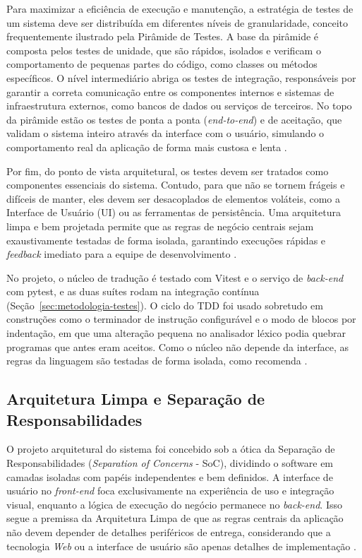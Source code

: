 Para maximizar a eficiência de execução e manutenção, a estratégia de testes de um sistema deve ser distribuída em diferentes níveis de granularidade, conceito frequentemente ilustrado pela Pirâmide de Testes. A base da pirâmide é composta pelos testes de unidade, que são rápidos, isolados e verificam o comportamento de pequenas partes do código, como classes ou métodos específicos. O nível intermediário abriga os testes de integração, responsáveis por garantir a correta comunicação entre os componentes internos e sistemas de infraestrutura externos, como bancos de dados ou serviços de terceiros. No topo da pirâmide estão os testes de ponta a ponta (\textit{end-to-end}) e de aceitação, que validam o sistema inteiro através da interface com o usuário, simulando o comportamento real da aplicação de forma mais custosa e lenta \cite{aniche2012,silveira2012}. %

Por fim, do ponto de vista arquitetural, os testes devem ser tratados como componentes essenciais do sistema. Contudo, para que não se tornem frágeis e difíceis de manter, eles devem ser desacoplados de elementos voláteis, como a Interface de Usuário (UI) ou as ferramentas de persistência. Uma arquitetura limpa e bem projetada permite que as regras de negócio centrais sejam exaustivamente testadas de forma isolada, garantindo execuções rápidas e \textit{feedback} imediato para a equipe de desenvolvimento \cite{martin_clean}. %

No projeto, o núcleo de tradução é testado com Vitest e o serviço de \textit{back-end} com pytest, e as duas suítes rodam na integração contínua (Seção~\ref{sec:metodologia-testes}). O ciclo do TDD foi usado sobretudo em construções como o terminador de instrução configurável e o modo de blocos por indentação, em que uma alteração pequena no analisador léxico podia quebrar programas que antes eram aceitos. Como o núcleo não depende da interface, as regras da linguagem são testadas de forma isolada, como recomenda .

\subsection{Arquitetura Limpa e Separação de Responsabilidades}

O projeto arquitetural do sistema foi concebido sob a ótica da Separação de Responsabilidades (\textit{Separation of Concerns} - SoC), dividindo o software em camadas isoladas com papéis independentes e bem definidos. A interface de usuário no \textit{front-end} foca exclusivamente na experiência de uso e integração visual, enquanto a lógica de execução do negócio permanece no \textit{back-end}. Isso segue a premissa da Arquitetura Limpa de que as regras centrais da aplicação não devem depender de detalhes periféricos de entrega, considerando que a tecnologia \textit{Web} ou a interface de usuário são apenas detalhes de implementação \cite{martin_clean}.

